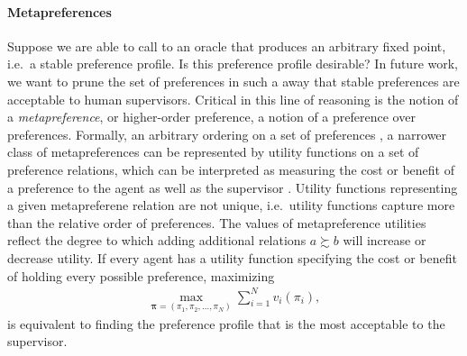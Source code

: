 \documentclass[conference]{ieeeconf}
\newcommand{\prefers}{\succsim}
\newcommand{\profile}{\boldsymbol{\pi}}
\begin{document}
\paragraph*{Metapreferences}
Suppose we are able to call to an oracle that produces an arbitrary fixed point, i.e.~a stable preference profile. Is this preference profile desirable? In future work, we want to prune the set of preferences in such a away that stable preferences are acceptable to human supervisors. Critical in this line of reasoning is the notion of a \emph{metapreference},  or higher-order preference, a notion of a preference over preferences. Formally, an arbitrary ordering on a set of preferences \cite{lutskanov2015}, a narrower class of metapreferences can be represented by utility functions on a set of preference relations, which can be interpreted as measuring the cost or benefit of a preference to the agent as well as the supervisor \cite{munger2019}. Utility functions representing a given metapreferene relation are not unique, i.e.~utility functions capture more than the relative order of preferences. The values of metapreference utilities reflect the degree to which adding additional relations $a \prefers b$ will increase or decrease utility. If every agent has a utility function specifying the cost or benefit of holding every possible preference, maximizing
\begin{align}
    \max_{\profile = (\pi_1,\pi_2,\dots,\pi_N)} \sum_{i=1}^N v_i(\pi_i), \label{eq:dist-opt}
\end{align}
is equivalent to finding the preference profile that is the most acceptable to the supervisor.
\end{document}
